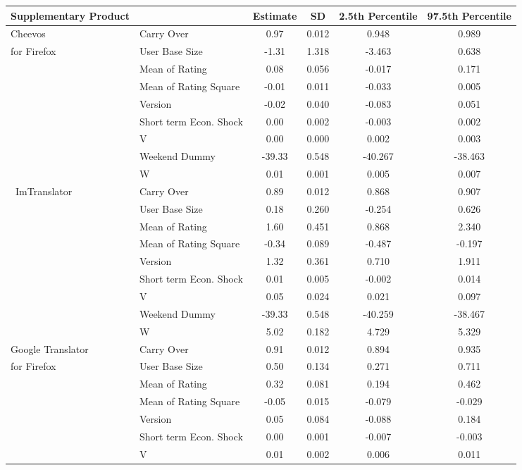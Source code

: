 \documentclass[mksc,nonblindrev]{informs3}
\begin{document}
\begin{table}
	\centering
		\begin{tabular}{llcccc}\hline \hline
Supplementary Product	&		&	Estimate	&	SD	&	2.5th 
Percentile	&	97.5th 
Percentile	\\ \hline
Cheevos 	&	Carry Over	&	0.97	&	0.012	&	0.948	&	0.989	\\
for Firefox	&	User Base Size	&	-1.31	&	1.318	&	-3.463	&	0.638	\\
	&	Mean of Rating	&	0.08	&	0.056	&	-0.017	&	0.171	\\
	&	Mean of Rating Square	&	-0.01	&	0.011	&	-0.033	&	0.005	\\
	&	Version	&	-0.02	&	0.040	&	-0.083	&	0.051	\\
	&	Short term Econ. Shock	&	0.00	&	0.002	&	-0.003	&	0.002	\\
	&	V	&	0.00	&	0.000	&	0.002	&	0.003	\\
	&	Weekend Dummy	&	-39.33	&	0.548	&	-40.267	&	-38.463	\\
	&	W	&	0.01	&	0.001	&	0.005	&	0.007	\\
 ImTranslator 	&	Carry Over	&	0.89	&	0.012	&	0.868	&	0.907	\\
	&	User Base Size	&	0.18	&	0.260	&	-0.254	&	0.626	\\
	&	Mean of Rating	&	1.60	&	0.451	&	0.868	&	2.340	\\
	&	Mean of Rating Square	&	-0.34	&	0.089	&	-0.487	&	-0.197	\\
	&	Version	&	1.32	&	0.361	&	0.710	&	1.911	\\
	&	Short term Econ. Shock	&	0.01	&	0.005	&	-0.002	&	0.014	\\
	&	V	&	0.05	&	0.024	&	0.021	&	0.097	\\
	&	Weekend Dummy	&	-39.33	&	0.548	&	-40.259	&	-38.467	\\
	&	W	&	5.02	&	0.182	&	4.729	&	5.329	\\
Google Translator 	&	Carry Over	&	0.91	&	0.012	&	0.894	&	0.935	\\
for Firefox	&	User Base Size	&	0.50	&	0.134	&	0.271	&	0.711	\\
	&	Mean of Rating	&	0.32	&	0.081	&	0.194	&	0.462	\\
	&	Mean of Rating Square	&	-0.05	&	0.015	&	-0.079	&	-0.029	\\
	&	Version	&	0.05	&	0.084	&	-0.088	&	0.184	\\
	&	Short term Econ. Shock	&	0.00	&	0.001	&	-0.007	&	-0.003	\\
	&	V	&	0.01	&	0.002	&	0.006	&	0.011	\\

\end{tabular}
\end{table}
\end{document}
